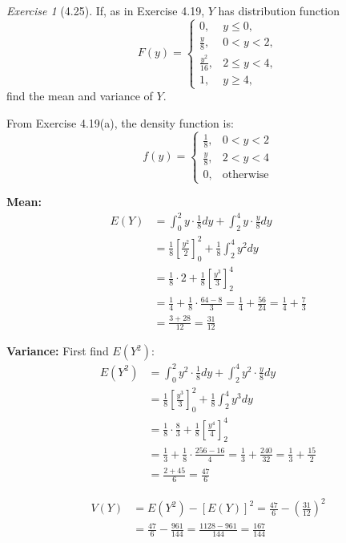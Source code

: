 \documentclass[12pt]{amsart}
\makeatletter
\theoremstyle{remark}
\newtheorem*{exercise}{Exercise}%
\renewenvironment{proof}[1][\proofname]{\par\doublespacing
  \pushQED{\qed}%
  \normalfont \topsep6\p@\@plus6\p@\relax
  \list{}{%
    \settowidth{\leftmargin}{\itshape\proofname:\hskip\labelsep}%
    \setlength{\labelwidth}{0pt}%
    \setlength{\itemindent}{-\leftmargin}%
  }%
  \item[\hskip\labelsep\itshape#1\@addpunct{:}]\ignorespaces
}{%
  \popQED\endlist\@endpefalse
  \singlespacing
}
\theoremstyle{mycomment}
\makeatother
\begin{document}
\begin{exercise}[4.25]
If, as in Exercise 4.19, $Y$ has distribution function
$$F(y) = \begin{cases}
0, & y \leq 0, \\
\frac{y}{8}, & 0 < y < 2, \\
\frac{y^2}{16}, & 2 \leq y < 4, \\
1, & y \geq 4,
\end{cases}$$
find the mean and variance of $Y$.

\begin{proof}[Solution]
From Exercise 4.19(a), the density function is:
$$f(y) = \begin{cases}
\frac{1}{8}, & 0 < y < 2 \\
\frac{y}{8}, & 2 < y < 4 \\
0, & \text{otherwise}
\end{cases}$$

\textbf{Mean:}
\begin{align*}
E(Y) &= \int_0^2 y \cdot \frac{1}{8} dy + \int_2^4 y \cdot \frac{y}{8} dy \\
&= \frac{1}{8}\left[\frac{y^2}{2}\right]_0^2 + \frac{1}{8}\int_2^4 y^2 dy \\
&= \frac{1}{8} \cdot 2 + \frac{1}{8}\left[\frac{y^3}{3}\right]_2^4 \\
&= \frac{1}{4} + \frac{1}{8} \cdot \frac{64 - 8}{3} = \frac{1}{4} + \frac{56}{24} = \frac{1}{4} + \frac{7}{3} \\
&= \frac{3 + 28}{12} = \frac{31}{12}
\end{align*}

\textbf{Variance:} First find $E(Y^2)$:
\begin{align*}
E(Y^2) &= \int_0^2 y^2 \cdot \frac{1}{8} dy + \int_2^4 y^2 \cdot \frac{y}{8} dy \\
&= \frac{1}{8}\left[\frac{y^3}{3}\right]_0^2 + \frac{1}{8}\int_2^4 y^3 dy \\
&= \frac{1}{8} \cdot \frac{8}{3} + \frac{1}{8}\left[\frac{y^4}{4}\right]_2^4 \\
&= \frac{1}{3} + \frac{1}{8} \cdot \frac{256 - 16}{4} = \frac{1}{3} + \frac{240}{32} = \frac{1}{3} + \frac{15}{2} \\
&= \frac{2 + 45}{6} = \frac{47}{6}
\end{align*}

\begin{align*}
V(Y) &= E(Y^2) - [E(Y)]^2 = \frac{47}{6} - \left(\frac{31}{12}\right)^2 \\
&= \frac{47}{6} - \frac{961}{144} = \frac{1128 - 961}{144} = \frac{167}{144}
\end{align*}
\end{proof}
\end{exercise}
\end{document}

